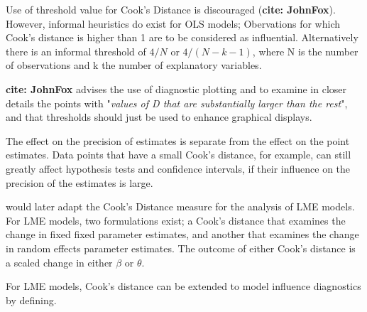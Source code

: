 \documentclass[12pt, a4paper]{report}
\theoremstyle{plain}
\theoremstyle{definition}
\theoremstyle{remark}
\begin{document}
Use of threshold value for Cook's Distance is discouraged (\textbf{cite: JohnFox}). However, informal heuristics do exist for OLS models; Obervations for which Cook's distance is higher than 1 are to be considered as influential. Alternatively there is an informal threshold of $4/N$ or $4/(N−k−1)$, where N is the number of observations and k the number of explanatory variables.



\textbf{cite: JohnFox} advises the use of diagnostic plotting and to examine in closer details the points with "\textit{values of D that are substantially larger than the rest}", and that thresholds should just be used to enhance graphical displays.


The effect on the precision of estimates is separate from the effect on the point estimates. Data points that have a small Cook's distance, for example, can still greatly affect hypothesis tests and confidence intervals, if their  influence on the precision of the estimates is large.

%
%
\citet{CPJ} would later adapt the Cook's Distance measure for the analysis of LME models. For LME models, two formulations exist; a Cook's distance that examines the change in fixed fixed parameter estimates, and another that examines the change in random effects parameter estimates. The outcome of either Cook's distance is a scaled change in either $\beta$ or $\theta$.

For LME models, Cook's distance can be extended to model influence diagnostics by defining.
 
\end{document}
